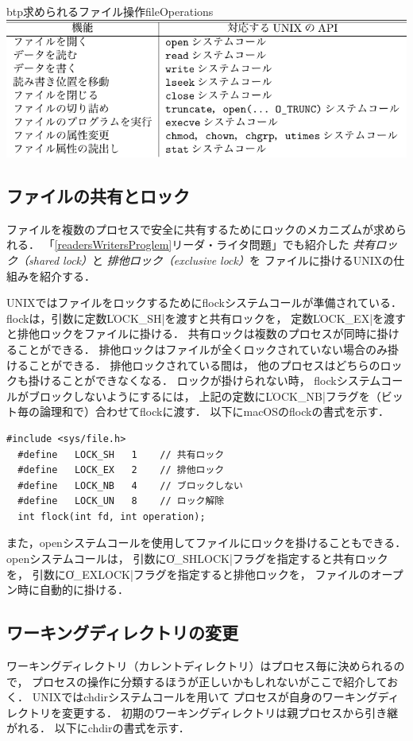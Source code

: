 \begin{mytable}{btp}{求められるファイル操作}{fileOperations}
  \includegraphics[scale=1.0]{Tbl/fileOperations.pdf}
\end{mytable}

\subsection{ファイルの共有とロック}
ファイルを複数のプロセスで安全に共有するためにロックのメカニズムが求められる．
「\ref{readersWritersProglem}リーダ・ライタ問題」でも紹介した
\emph{共有ロック（shared lock）}と
\emph{排他ロック（exclusive lock）}を
ファイルに掛けるUNIXの仕組みを紹介する．

UNIXではファイルをロックするためにflockシステムコールが準備されている．
flockは，引数に定数\|LOCK_SH|を渡すと共有ロックを，
定数\|LOCK_EX|を渡すと排他ロックをファイルに掛ける．
共有ロックは複数のプロセスが同時に掛けることができる．
排他ロックはファイルが全くロックされていない場合のみ掛けることができる．
排他ロックされている間は，
他のプロセスはどちらのロックも掛けることができなくなる．
ロックが掛けられない時，
flockシステムコールがブロックしないようにするには，
上記の定数に\|LOCK_NB|フラグを（ビット毎の論理和で）合わせてflockに渡す．
以下にmacOSのflockの書式を示す．

\newpage
\begin{lstlisting}[numbers=none]
  #include <sys/file.h>
  #define   LOCK_SH   1    // 共有ロック
  #define   LOCK_EX   2    // 排他ロック
  #define   LOCK_NB   4    // ブロックしない
  #define   LOCK_UN   8    // ロック解除
  int flock(int fd, int operation);
\end{lstlisting}

また，openシステムコールを使用してファイルにロックを掛けることもできる．
openシステムコールは，
引数に\|O_SHLOCK|フラグを指定すると共有ロックを，
引数に\|O_EXLOCK|フラグを指定すると排他ロックを，
ファイルのオープン時に自動的に掛ける．

\subsection{ワーキングディレクトリの変更}
ワーキングディレクトリ（カレントディレクトリ）はプロセス毎に決められるので，
プロセスの操作に分類するほうが正しいかもしれないがここで紹介しておく．
UNIXではchdirシステムコールを用いて
プロセスが自身のワーキングディレクトリを変更する．
初期のワーキングディレクトリは親プロセスから引き継がれる．
以下にchdirの書式を示す．

